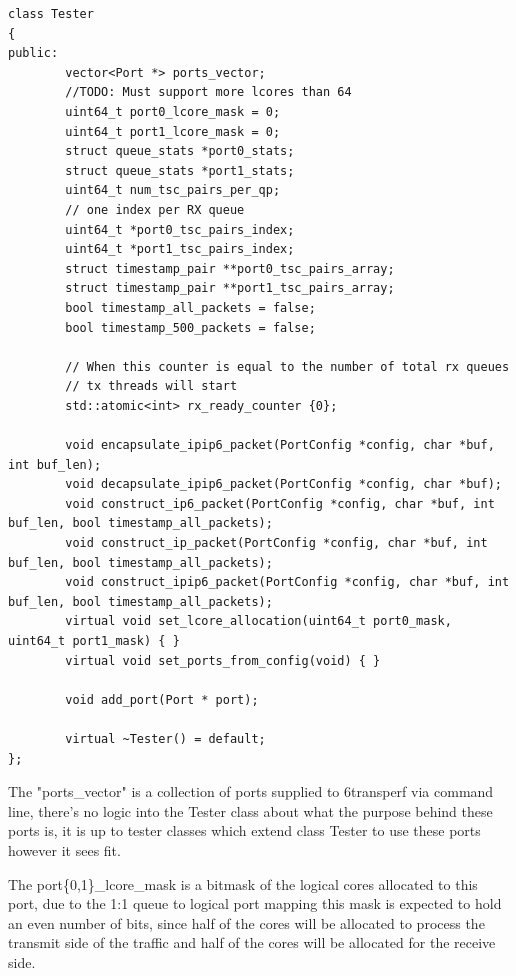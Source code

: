 \documentclass[a4paper,12p,titlepage]{article}
\begin{document}
\begin{frame}

\lstset{language=C++,breaklines=true,numbers=left}
\begin{lstlisting}
class Tester
{
public:
        vector<Port *> ports_vector;
        //TODO: Must support more lcores than 64
        uint64_t port0_lcore_mask = 0;
        uint64_t port1_lcore_mask = 0;
        struct queue_stats *port0_stats;
        struct queue_stats *port1_stats;
        uint64_t num_tsc_pairs_per_qp;
        // one index per RX queue
        uint64_t *port0_tsc_pairs_index;
        uint64_t *port1_tsc_pairs_index;
        struct timestamp_pair **port0_tsc_pairs_array;
        struct timestamp_pair **port1_tsc_pairs_array;
        bool timestamp_all_packets = false;
        bool timestamp_500_packets = false;

        // When this counter is equal to the number of total rx queues
        // tx threads will start
        std::atomic<int> rx_ready_counter {0};

        void encapsulate_ipip6_packet(PortConfig *config, char *buf, int buf_len);
        void decapsulate_ipip6_packet(PortConfig *config, char *buf);
        void construct_ip6_packet(PortConfig *config, char *buf, int buf_len, bool timestamp_all_packets);
        void construct_ip_packet(PortConfig *config, char *buf, int buf_len, bool timestamp_all_packets);
        void construct_ipip6_packet(PortConfig *config, char *buf, int buf_len, bool timestamp_all_packets);
        virtual void set_lcore_allocation(uint64_t port0_mask, uint64_t port1_mask) { }
        virtual void set_ports_from_config(void) { }

        void add_port(Port * port);

        virtual ~Tester() = default;
};
\end{lstlisting}
\end{frame}

The "ports\_vector" is a collection of ports supplied to 6transperf via command line, there’s no logic into the Tester class about what the purpose behind these ports is, it is up to tester classes which extend class Tester to use these ports however it sees fit.

The port\{0,1\}\_lcore\_mask is a bitmask of the logical cores allocated to this port, due to the 1:1 queue to logical port mapping this mask is expected to hold an even number of bits, since half of the cores will be allocated to process the transmit side of the traffic and half of the cores will be allocated for the receive side.
\end{document}
